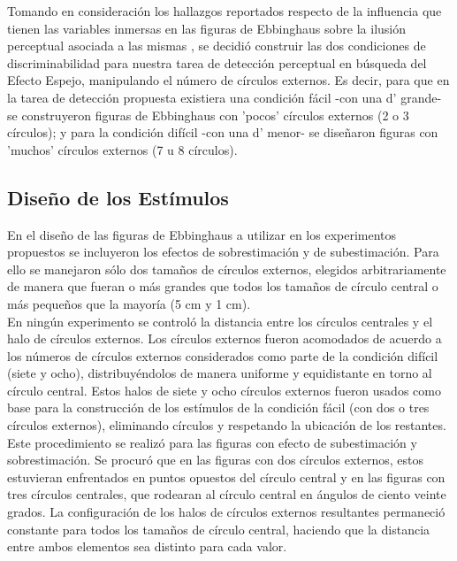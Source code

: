 Tomando en consideración los hallazgos reportados respecto de la influencia que tienen las variables inmersas en las figuras de Ebbinghaus sobre la ilusión perceptual asociada a las mismas \parencite{Massaro1971}, se decidió construir las dos condiciones de discriminabilidad para nuestra tarea de detección perceptual en búsqueda del Efecto Espejo, manipulando el número de círculos externos. Es decir, para que en la tarea de detección propuesta existiera una condición fácil -con una d' grande- se construyeron figuras de Ebbinghaus con 'pocos' círculos externos (2 o 3 círculos); y para la condición difícil -con una d' menor- se diseñaron figuras con 'muchos' círculos externos (7 u 8 círculos).\\ 

\subsection{Diseño de los Estímulos}

En el diseño de las figuras de Ebbinghaus a utilizar en los experimentos propuestos se incluyeron los efectos de sobrestimación y de subestimación. Para ello se manejaron sólo dos tamaños de círculos externos, elegidos arbitrariamente de manera que fueran o más grandes que todos los tamaños de círculo central o más pequeños que la mayoría (5 cm y 1 cm).\\

En ningún experimento se controló la distancia entre los círculos centrales y el halo de círculos externos. Los círculos externos fueron acomodados de acuerdo a los números de círculos externos considerados como parte de la condición difícil (siete y ocho), distribuyéndolos de manera uniforme y equidistante en torno al círculo central. Estos halos de siete y ocho círculos externos fueron usados como base para la construcción de los estímulos de la condición fácil (con dos o tres círculos externos), eliminando círculos y respetando la ubicación de los restantes. Este procedimiento se realizó para las figuras con efecto de subestimación y sobrestimación. Se procuró que en las figuras con dos círculos externos, estos estuvieran enfrentados en puntos opuestos del círculo central y en las figuras con tres círculos centrales, que rodearan al círculo central en ángulos de ciento veinte grados. La configuración de los halos de círculos externos resultantes permaneció constante para todos los tamaños de círculo central, haciendo que la distancia entre ambos elementos sea distinto para cada valor.\\

